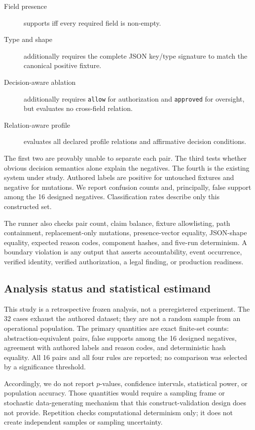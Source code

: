 \documentclass[preprint,12pt]{elsarticle}
\newcommand{\code}[1]{\texttt{#1}}
\begin{document}
\begin{description}
  \item[Field presence] supports iff every required field is non-empty.
  \item[Type and shape] additionally requires the complete JSON key/type signature to match the canonical positive fixture.
  \item[Decision-aware ablation] additionally requires \code{allow} for authorization and \code{approved} for oversight, but evaluates no cross-field relation.
  \item[Relation-aware profile] evaluates all declared profile relations and affirmative decision conditions.
\end{description}

The first two are provably unable to separate each pair. The third tests whether obvious decision semantics alone explain the negatives. The fourth is the existing system under study. Authored labels are positive for untouched fixtures and negative for mutations. We report confusion counts and, principally, false support among the 16 designed negatives. Classification rates describe only this constructed set.

The runner also checks pair count, claim balance, fixture allowlisting, path containment, replacement-only mutations, presence-vector equality, JSON-shape equality, expected reason codes, component hashes, and five-run determinism. A boundary violation is any output that asserts accountability, event occurrence, verified identity, verified authorization, a legal finding, or production readiness.

\subsection{Analysis status and statistical estimand}

This study is a retrospective frozen analysis, not a preregistered experiment. The 32 cases exhaust the authored dataset; they are not a random sample from an operational population. The primary quantities are exact finite-set counts: abstraction-equivalent pairs, false supports among the 16 designed negatives, agreement with authored labels and reason codes, and deterministic hash equality. All 16 pairs and all four rules are reported; no comparison was selected by a significance threshold.

Accordingly, we do not report $p$-values, confidence intervals, statistical power, or population accuracy. Those quantities would require a sampling frame or stochastic data-generating mechanism that this construct-validation design does not provide. Repetition checks computational determinism only; it does not create independent samples or sampling uncertainty.
\end{document}
